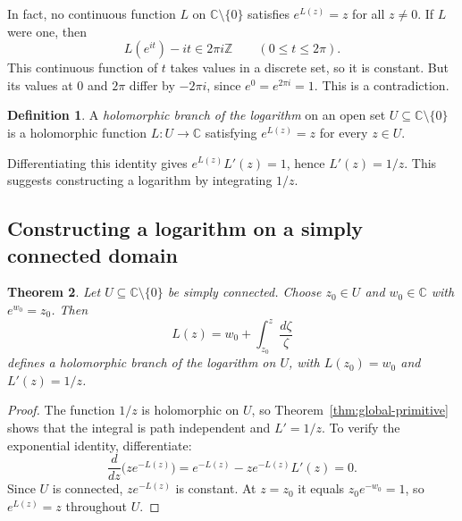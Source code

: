 \documentclass[11pt]{article}
\theoremstyle{plain}
\newtheorem{theorem}{Theorem}[section]
\theoremstyle{definition}
\newtheorem{definition}[theorem]{Definition}
\theoremstyle{remark}
\numberwithin{equation}{section}
\newcommand{\C}{\mathbb{C}}
\newcommand{\Z}{\mathbb{Z}}
\begin{document}
\begin{center}
\end{center}

In fact, no continuous function $L$ on $\C\setminus\{0\}$ satisfies
$e^{L(z)}=z$ for all $z\ne0$. If $L$ were one, then
\[
 L(e^{it})-it\in2\pi i\Z\qquad(0\leq t\leq2\pi).
\]
This continuous function of $t$ takes values in a discrete set, so it
is constant. But its values at $0$ and $2\pi$ differ by $-2\pi i$,
since $e^0=e^{2\pi i}=1$. This is a contradiction.

\begin{definition}
A \emph{holomorphic branch of the logarithm} on an open set
$U\subseteq\C\setminus\{0\}$ is a holomorphic function $L\colon U\to\C$
satisfying $e^{L(z)}=z$ for every $z\in U$.
\end{definition}
Differentiating this identity gives $e^{L(z)}L'(z)=1$, hence
$L'(z)=1/z$. This suggests constructing a logarithm by integrating $1/z$.

\subsection{Constructing a logarithm on a simply connected domain}
\begin{theorem}\label{thm:log-z}
Let $U\subseteq\C\setminus\{0\}$ be simply connected. Choose $z_0\in U$
and $w_0\in\C$ with $e^{w_0}=z_0$. Then
\[
 \boxed{\displaystyle L(z)=w_0+\int_{z_0}^z\frac{d\zeta}{\zeta}}
\]
defines a holomorphic branch of the logarithm on $U$, with
$L(z_0)=w_0$ and $L'(z)=1/z$.
\end{theorem}
\begin{proof}
The function $1/z$ is holomorphic on $U$, so Theorem~\ref{thm:global-primitive}
shows that the integral is path independent and $L'=1/z$.
To verify the exponential identity, differentiate:
\[
 \frac{d}{dz}\bigl(ze^{-L(z)}\bigr)
 =e^{-L(z)}-ze^{-L(z)}L'(z)=0.
\]
Since $U$ is connected, $ze^{-L(z)}$ is constant. At $z=z_0$ it equals
$z_0e^{-w_0}=1$, so $e^{L(z)}=z$ throughout $U$.
\end{proof}
\end{document}
